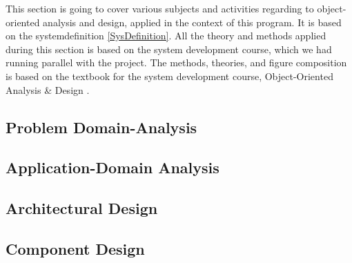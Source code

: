 This section is going to cover various subjects and activities regarding to object-oriented analysis and design, applied in the context of this program. It is based on the systemdefinition \ref{SysDefinition}. All the theory and methods applied during this section is based on the system development course, which we had running parallel with the project. The methods, theories, and figure composition is based on the textbook for the system development course, Object-Oriented Analysis \& Design \citep{ObjektAnalyseDesign}.

\subsection{Problem Domain-Analysis}
\label{ProblemDomain}

\subsection{Application-Domain Analysis}
\label{ApplicationDomain}

\subsection{Architectural Design}
\label{ArchDes}

\subsection{Component Design}
\label{ComponentDesign}
